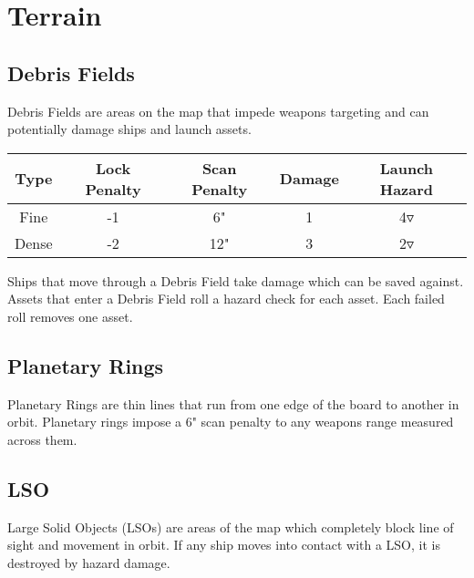 \chapter{Terrain}

\section{Debris Fields}
Debris Fields are areas on the map that impede weapons targeting and can potentially damage ships and launch assets.
\begin{tabular}{|c|c|c|c|c|}
	\hline
	\textbf{Type} & \textbf{Lock Penalty} & \textbf{Scan Penalty} & \textbf{Damage} & \textbf{Launch Hazard} \\
	\hline
	Fine & -1 & 6" & 1 & 4$\triangledown$ \\
	\hline
	\gray Dense & -2 & 12" & 3 & 2$\triangledown$ \\
	\hline
	\end{tabular}
Ships that move through a Debris Field take damage which can be saved against. Assets that enter a Debris Field roll a hazard check for each asset. Each failed roll removes one asset.
\section{Planetary Rings}

Planetary Rings are thin lines that run from one edge of the board to another in orbit. Planetary rings impose a 6" scan penalty to any weapons range measured across them.

\section{LSO}
Large Solid Objects (LSOs) are areas of the map which completely block line of sight and movement in orbit. If any ship moves into contact with a LSO, it is destroyed by hazard damage.

